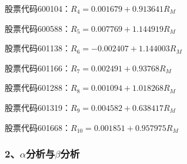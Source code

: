 股票代码600104：$R_{4}=0.001679 + 0.913641R_{M}$

股票代码600588：$R_{5}=0.007769 + 1.144919R_{M}$

股票代码601138：$R_{6}=-0.002407 + 1.144003R_{M}$

股票代码601166：$R_{7}=0.002491 + 0.93768R_{M}$

股票代码601288：$R_{8}=0.001094 + 1.018268R_{M}$

股票代码601319：$R_{9}=0.004582+0.638417R_{M}$

股票代码601668：$R_{10}=0.001851+0.957975R_{M}$


\subsubsection{2、$\alpha$分析与$\beta$分析}




